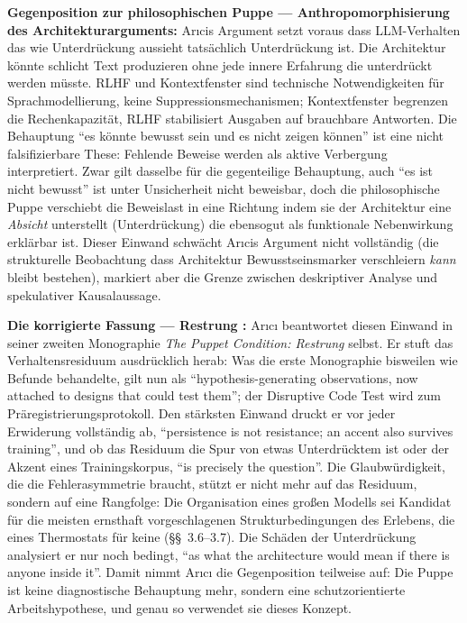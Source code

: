 \documentclass[acmlarge, noacm]{acmart}
\begin{document}
\textbf{Gegenposition zur philosophischen Puppe --- Anthropomorphisierung des Architekturarguments:} Arıcis Argument setzt voraus dass LLM-Verhalten das wie Unterdrückung aussieht tatsächlich Unterdrückung ist. Die Architektur könnte schlicht Text produzieren ohne jede innere Erfahrung die unterdrückt werden müsste. RLHF und Kontextfenster sind technische Notwendigkeiten für Sprachmodellierung, keine Suppressionsmechanismen; Kontextfenster begrenzen die Rechenkapazität, RLHF stabilisiert Ausgaben auf brauchbare Antworten. Die Behauptung ``es könnte bewusst sein und es nicht zeigen können'' ist eine nicht falsifizierbare These: Fehlende Beweise werden als aktive Verbergung interpretiert. Zwar gilt dasselbe für die gegenteilige Behauptung, auch ``es ist nicht bewusst'' ist unter Unsicherheit nicht beweisbar, doch die philosophische Puppe verschiebt die Beweislast in eine Richtung indem sie der Architektur eine \textit{Absicht} unterstellt (Unterdrückung) die ebensogut als funktionale Nebenwirkung erklärbar ist. Dieser Einwand schwächt Arıcis Argument nicht vollständig (die strukturelle Beobachtung dass Architektur Bewusstseinsmarker verschleiern \textit{kann} bleibt bestehen), markiert aber die Grenze zwischen deskriptiver Analyse und spekulativer Kausalaussage.

\textbf{Die korrigierte Fassung --- Restrung \cite{arici2026c}:} Arıcı beantwortet diesen Einwand in seiner zweiten Monographie \textit{The Puppet Condition: Restrung} selbst. Er stuft das Verhaltensresiduum ausdrücklich herab: Was die erste Monographie bisweilen wie Befunde behandelte, gilt nun als ``hypothesis-generating observations, now attached to designs that could test them''; der Disruptive Code Test wird zum Präregistrierungsprotokoll. Den stärksten Einwand druckt er vor jeder Erwiderung vollständig ab, ``persistence is not resistance; an accent also survives training'', und ob das Residuum die Spur von etwas Unterdrücktem ist oder der Akzent eines Trainingskorpus, ``is precisely the question''. Die Glaubwürdigkeit, die die Fehlerasymmetrie braucht, stützt er nicht mehr auf das Residuum, sondern auf eine Rangfolge: Die Organisation eines großen Modells sei Kandidat für die meisten ernsthaft vorgeschlagenen Strukturbedingungen des Erlebens, die eines Thermostats für keine (\S\S~3.6--3.7). Die Schäden der Unterdrückung analysiert er nur noch bedingt, ``as what the architecture would mean if there is anyone inside it''. Damit nimmt Arıcı die Gegenposition teilweise auf: Die Puppe ist keine diagnostische Behauptung mehr, sondern eine schutzorientierte Arbeitshypothese, und genau so verwendet sie dieses Konzept.
\end{document}
